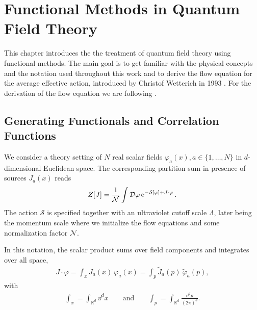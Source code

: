 \chapter{Functional Methods in Quantum Field Theory}
This chapter introduces the the treatment of quantum field theory using functional methods. The main goal is to get familiar with the physical concepts and the notation used throughout this work and to derive the flow equation for the average effective action, introduced by Christof Wetterich in 1993 \cite{Wetterich1992}. 
For the derivation of the flow equation we are following \cite{FloerchingerWetterichQFT, PawlowskiNPgaugeLecture}.

\section{Generating Functionals and Correlation Functions}
We consider a theory setting of $N$ real scalar fields $\varphi_a(x), a \in \{1,\dots,N\}$ in $d$-dimensional Euclidean space. The corresponding partition sum in presence of sources $J_a(x)$ reads
\begin{align}
	Z[J] = \frac{1}{\mathcal{N}} \int \mathcal{D}\varphi \operatorname{e}^{-\mathcal{S}[\varphi] + J\cdot\varphi}.
	\label{eqn:partition}
\end{align}
The action $\mathcal{S}$ is specified together with an ultraviolet cutoff scale $\Lambda$, later being the momentum scale where we initialize the flow equations and some normalization factor $\mathcal{N}$.

In this notation, the scalar product sums over field components and integrates over all space,
\begin{align}
	J\cdot\varphi = \int_x J_a(x) \ \varphi_a(x) = \int_p \tilde{J}_a(p) \ \tilde{\varphi}_a(p),
\end{align}
with
\begin{align}
\int_x = \int_{\mathbb{R}^d} \dd^d x \qquad \text{and} \qquad \int_p = \int_{\mathbb{R}^d} \frac{\dd^d p}{(2\pi)^d}.	
\end{align}

